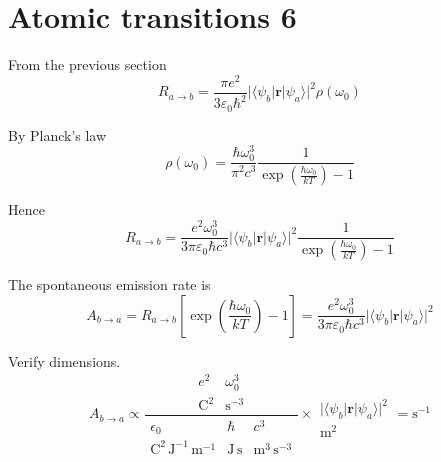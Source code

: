 

\section*{Atomic transitions 6}

From the previous section
\begin{equation*}
R_{a\rightarrow b}
=\frac{\pi e^2}{3\varepsilon_0\hbar^2}
\bigl|\langle\psi_b|\mathbf r|\psi_a\rangle\bigr|^2\rho(\omega_0)
\end{equation*}

By Planck's law
\begin{equation*}
\rho(\omega_0)=\frac{\hbar\omega_0^3}{\pi^2c^3}
\frac{1}{\exp\left(\frac{\hbar\omega_0}{kT}\right)-1}
\end{equation*}

Hence
\begin{equation*}
R_{a\rightarrow b}
=\frac{e^2\omega_0^3}{3\pi\varepsilon_0\hbar c^3}
\bigl|\langle\psi_b|\mathbf r|\psi_a\rangle\bigr|^2
\frac{1}{\exp\left(\frac{\hbar\omega_0}{kT}\right)-1}
\tag{1}
\end{equation*}

The spontaneous emission rate is
\begin{equation*}
A_{b\rightarrow a}=R_{a\rightarrow b}\left[\exp\left(\frac{\hbar\omega_0}{kT}\right)-1\right]
=\frac{e^2\omega_0^3}{3\pi\varepsilon_0\hbar c^3}
\bigl|\langle\psi_b|\mathbf r|\psi_a\rangle\bigr|^2
\end{equation*}

Verify dimensions.
\begin{equation*}
A_{b\rightarrow a}\propto
\frac{
\begin{matrix}
e^2 & \omega_0^3
\\
\text{C}^2 & \text{s}^{-3}
\end{matrix}
}
{
\begin{matrix}
\epsilon_0 & \hbar & c^3
\\
\text{C}^2\,\text{J}^{-1}\,\text{m}^{-1}
& \text{J}\,\text{s}
& \text{m}^3\,\text{s}^{-3}
\end{matrix}
}
\times
\begin{matrix}
\\
\bigl|\langle\psi_b|\mathbf r|\psi_a\rangle\bigr|^2
\\
\text{m}^2
\end{matrix}
=\text{s}^{-1}
\end{equation*}


